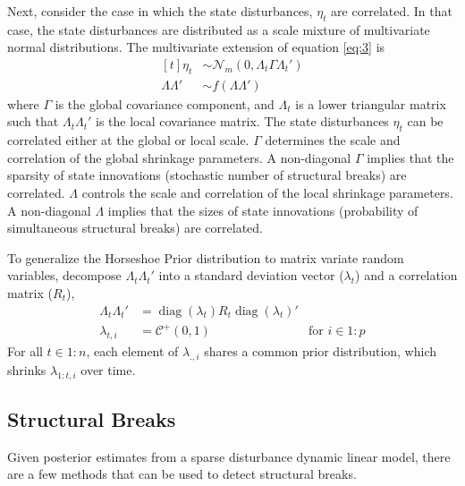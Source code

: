 \documentclass{article}
\newcommand{\dist}[1]{\mathcal{#1}}
\newcommand{\paren}[1]{\ensuremath{\left(#1\right)}}
\newcommand{\dmvnorm}[2]{\ensuremath{\dist{N}_{#2}\paren{#1}}}
\newcommand{\dhalfcauchy}[1]{\ensuremath{\dist{C}^{+}\paren{#1}}}
\DeclareMathOperator{\diag}{diag}
\begin{document}
Next, consider the case in which the state disturbances, $\eta_{t}$ are correlated.
In that case, the state disturbances are distributed as a scale mixture of multivariate normal distributions.
The multivariate extension of equation \eqref{eq:3} is
\begin{equation}
  \begin{aligned}[t]
    \eta_{t} &\sim \dmvnorm{0, \Lambda_{t} \Gamma \Lambda_{t}'}{m} \\
    \Lambda \Lambda' & \sim f(\Lambda \Lambda')
  \end{aligned}
\end{equation}
where $\Gamma$ is the global covariance component, and $\Lambda_{t}$ is a lower triangular matrix such that  $\Lambda_{t} \Lambda_{t}'$ is the local covariance matrix.
The state disturbances $\eta_{t}$ can be correlated either at the global or local scale.
$\Gamma$ determines the scale and correlation of the global shrinkage parameters.
A non-diagonal $\Gamma$ implies that the sparsity of state innovations (stochastic number of structural breaks) are correlated.
$\Lambda$ controls the scale and correlation of the local shrinkage parameters.
A non-diagonal $\Lambda$ implies that the sizes of state innovations (probability of simultaneous structural breaks) are correlated.

To generalize the Horseshoe Prior distribution to matrix variate random variables, decompose $\Lambda_{t} \Lambda_{t}'$ into a standard deviation vector ($\lambda_{t}$) and a correlation matrix ($R_{t}$),%
\begin{align}
  \label{eq:16}
  \Lambda_{t} \Lambda_{t}' &= \diag(\lambda_{t}) R_{t} \diag(\lambda_{t})' \\
  \label{eq:17}
  \lambda_{t,i} &= \dhalfcauchy{0, 1} & \text{for $i \in 1:p$}
\end{align}
For all $t \in 1:n$, each element of $\lambda_{.,i}$ shares a common prior distribution, which shrinks $\lambda_{1:t,i}$ over time.

\subsection{Structural Breaks}

Given posterior estimates from a sparse disturbance dynamic linear model, there are a few methods that can be used to detect structural breaks.
\end{document}
